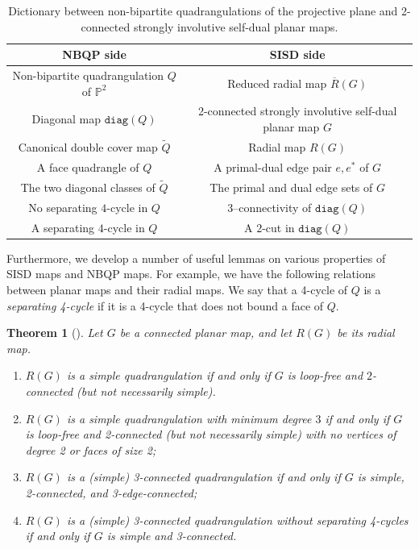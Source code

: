 \documentclass[10pt,a4paper]{article}
\renewcommand{\arraystretch}{1.5}
\newtheorem{theorem}{Theorem}[section]
\newcommand{\Pb}[0]{\mathbb{P}}
\newcommand{\diag}[0]{\mathtt{diag}}
\begin{document}
 \begin{table}[ht]
\centering
\renewcommand{\arraystretch}{1.25}
\begin{tabular}{c|c}
\textbf{NBQP side} & \textbf{SISD side} \\
\hline
Non-bipartite quadrangulation $Q$ of $\Pb^2$
&
Reduced radial map $\overline R(G)$
\\
Diagonal map  $\diag(Q)$
&
2-connected strongly involutive self-dual planar map $G$
\\

Canonical double cover map $\widetilde Q$
&
Radial map $R(G)$
\\

A face quadrangle of $Q$
&
A primal-dual edge pair $e,e^*$ of $G$
\\

The two diagonal classes of $\widetilde Q$
&
The primal and dual edge sets of $G$
\\

No separating $4$-cycle in $Q$
&
3--connectivity of $\diag(Q)$
\\

A separating $4$-cycle in $Q$
&
A $2$-cut in $\diag(Q)$
\\

\end{tabular}
\caption{Dictionary between non-bipartite quadrangulations of the projective plane and 2-connected strongly involutive self-dual planar maps.}
\label{tab:nbqp-sisd-dictionary}
\end{table}
 

Furthermore, we develop a number of useful lemmas on various properties of SISD maps and NBQP maps. For example, we have the following relations between planar maps and their radial maps. We say that a 4-cycle of $Q$ is a \emph{separating 4-cycle} if it is a 4-cycle that does not bound a face of $Q$.  

\begin{theorem}[{\cite[Theorem~5]{BrinkmannEtAl2005}}]\label{thm:radialprops}   
Let $G$ be a connected planar map, and let $R(G)$ be its radial map. 
\begin{enumerate}
    
    \item $R(G)$ is a simple quadrangulation if and only if $G$ is loop-free and $2$-connected (but not necessarily simple).
    \item $R(G)$ is a simple quadrangulation with minimum degree $3$ if and only if $G$ is loop-free and 2-connected (but not necessarily simple) with no vertices of degree 2 or faces of size 2;
    \item $R(G)$ is a (simple) 3-connected quadrangulation if and only if $G$ is simple, 2-connected, and 3-edge-connected;
    \item $R(G)$ is a (simple) 3-connected quadrangulation without separating 4-cycles if and only if $G$ is simple and 3-connected.
\end{enumerate}
\end{theorem}
\end{document}
